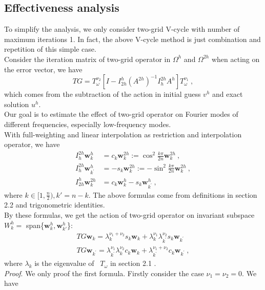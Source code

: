 \documentclass[a4paper,twocolumn]{article}
\theoremstyle{definition}
\begin{document}
\subsection{Effectiveness analysis}
To simplify the analysis, we only consider two-grid V-cycle with number of maximum iterations 1. In fact, the above V-cycle method is just combination and repetition of this simple case.\\
Consider the iteration matrix of two-grid operator in $\Omega^h$ and $\Omega^{2h}$ when acting on the error vector, we have
$$
T G=T_{\omega}^{\nu_{2}}\left[I-I_{2 h}^{h}\left(A^{2 h}\right)^{-1} I_{h}^{2 h} A^{h}\right] T_{\omega}^{\nu_{1}} \ ,         
$$
which comes from the subtraction of the action in initial guess $v^h$ and exact solution $u^h$.\\
Our goal is to estimate the effect of two-grid operator on Fourier modes of different frequencies, especially low-frequency modes. \\
With full-weighting and linear interpolation as restriction and interpolation operator, we have
$$
\begin{aligned}
I_{h}^{2 h} \mathbf{w}_{k}^{h} &=c_{k} \mathbf{w}_{k}^{2 h}:=\cos ^{2} \frac{k \pi}{2 n} \mathbf{w}_{k}^{2 h}  \ ,\\
I_{h}^{2 h} \mathbf{w}_{k^{\prime}}^{h} &=-s_{k} \mathbf{w}_{k}^{2 h}:=-\sin ^{2} \frac{k \pi}{2 n} \mathbf{w}_{k}^{2 h} \ , \\
I_{2 h}^{h} \mathbf{w}_{k}^{2 h}&=c_{k} \mathbf{w}_{k}^{h}-s_{k} \mathbf{w}_{k^{\prime}}^{h} \ ,
\end{aligned}
$$
where $k \in [1,\frac{n}{2}), k'= n-k$. The above formulas come from definitions in section 2.2 and trigonometric identities. \\
By these formulas, we get the action of two-grid operator on invariant subspace $W_k^h = $ span\{$\mathbf{w}_k^h,\mathbf{w}_{k'}^h$\}:
$$
\begin{array}{l}
T G \mathbf{w}_{k}=\lambda_{k}^{\nu_{1}+\nu_{2}} s_{k} \mathbf{w}_{k}+\lambda_{k}^{\nu_{1}} \lambda_{k^{\prime}}^{\nu_{2}} s_{k} \mathbf{w}_{k^{\prime}}  \\
T G \mathbf{w}_{k^{\prime}}=\lambda_{k^{\prime}}^{\nu_{1}} \lambda_{k}^{\nu_{2}} c_{k} \mathbf{w}_{k}+\lambda_{k^{\prime}}^{\nu_{1}+\nu_{2}} c_{k} \mathbf{w}_{k^{\prime}} \ ,
\end{array}
$$
where $\lambda_k$ is the eigenvalue of \ $T_\omega$ in section 2.1 .\\
\textit{Proof}. We only proof the first formula. Firstly consider the case $\nu_1 = \nu_2 = 0$. We have
\end{document}
